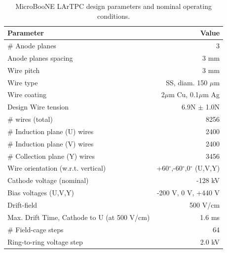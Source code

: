 \begin{table}[!htb]
   \centering
     \caption{MicroBooNE LArTPC design parameters and nominal operating conditions.} 
    \begin{tabular}{lr} %
    \hline
    Parameter & Value \\
    \hline
    $\#$ Anode planes & 3\\
     Anode planes spacing& 3 mm \\
     Wire pitch & 3 mm  \\
     Wire type & SS, diam. 150 $\mu$m\\
     Wire coating & 2$\mu$m Cu, 0.1$\mu$m Ag\\
     Design Wire tension & 6.9N $\pm$ 1.0N\\
     $\#$ wires (total) & 8256 \\
     $\#$ Induction plane (U) wires & 2400 \\
     $\#$ Induction plane (V) wires & 2400 \\
     $\#$ Collection plane (Y) wires & 3456 \\
     Wire orientation (w.r.t. vertical) & +60$^{\circ}$,-60$^{\circ}$,0$^{\circ}$ (U,V,Y) \\
     \hline
     Cathode voltage (nominal) & -128 kV \\
     Bias voltages (U,V,Y) & -200 V, 0 V, +440 V \\
     Drift-field & 500 V/cm\\
     Max. Drift Time, Cathode to U (at 500 V/cm) & 1.6 ms\\
    \hline
    $\#$ Field-cage steps & 64\\
    Ring-to-ring voltage step & 2.0 kV\\
    \hline
   \end{tabular}
   \label{UB_TPC_stats_table}
\end{table} 



